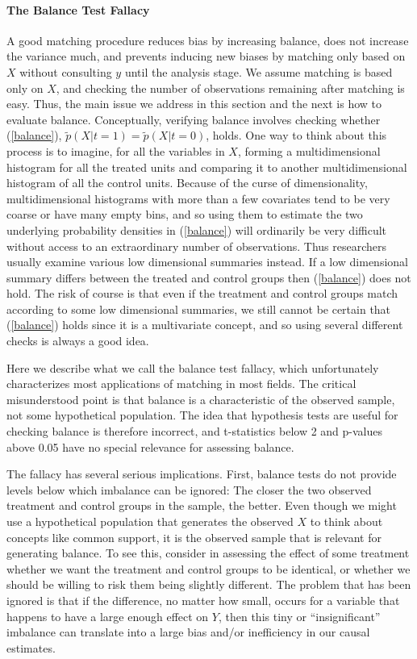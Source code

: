\documentclass[11pt,titlepage]{article}
\begin{document}
\paragraph{The Balance Test Fallacy}

A good matching procedure reduces bias by increasing balance, does not
increase the variance much, and prevents inducing new biases by
matching only based on $X$ without consulting $y$ until the analysis
stage.  We assume matching is based only on $X$, and checking the
number of observations remaining after matching is easy.  Thus, the
main issue we address in this section and the next is how to evaluate
balance.  Conceptually, verifying balance involves checking whether
(\ref{balance}), $\tilde p(X|t=1)=\tilde p(X|t=0)$, holds.  One way to
think about this process is to imagine, for all the variables in $X$,
forming a multidimensional histogram for all the treated units and
comparing it to another multidimensional histogram of all the control
units.  Because of the curse of dimensionality, multidimensional
histograms with more than a few covariates tend to be very coarse or
have many empty bins, and so using them to estimate the two underlying
probability densities in (\ref{balance}) will ordinarily be very
difficult without access to an extraordinary number of observations.
Thus researchers usually examine various low dimensional summaries
instead.  If a low dimensional summary differs between the treated and
control groups then (\ref{balance}) does not hold.  The risk of course
is that even if the treatment and control groups match according to
some low dimensional summaries, we still cannot be certain that
(\ref{balance}) holds since it is a multivariate concept, and so using
several different checks is always a good idea.

Here we describe what we call the balance test fallacy, which
unfortunately characterizes most applications of matching in most
fields.  The critical misunderstood point is that balance is a
characteristic of the observed sample, not some hypothetical
population.  The idea that hypothesis tests are useful for checking
balance is therefore incorrect, and t-statistics below 2 and p-values
above 0.05 have no special relevance for assessing balance.

The fallacy has several serious implications.  First, balance tests do
not provide levels below which imbalance can be ignored: The closer
the two observed treatment and control groups in the sample, the
better.  Even though we might use a hypothetical population that
generates the observed $X$ to think about concepts like common
support, it is the observed sample that is relevant for generating
balance.  To see this, consider in assessing the effect of some
treatment whether we want the treatment and control groups to be
identical, or whether we should be willing to risk them being slightly
different.  The problem that has been ignored is that if the
difference, no matter how small, occurs for a variable that happens to
have a large enough effect on $Y$, then this tiny or ``insignificant''
imbalance can translate into a large bias and/or inefficiency in our
causal estimates.
\end{document}
